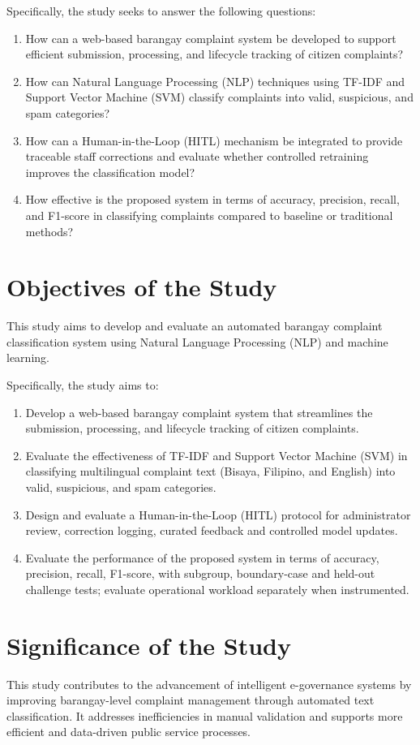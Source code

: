 Specifically, the study seeks to answer the following questions:
\begin{enumerate}
    \item How can a web-based barangay complaint system be developed to support efficient submission, processing, and lifecycle tracking of citizen complaints?
    \item How can Natural Language Processing (NLP) techniques using TF-IDF and Support Vector Machine (SVM) classify complaints into valid, suspicious, and spam categories?
    \item How can a Human-in-the-Loop (HITL) mechanism be integrated to provide traceable staff corrections and evaluate whether controlled retraining improves the classification model?
    \item How effective is the proposed system in terms of accuracy, precision, recall, and F1-score in classifying complaints compared to baseline or traditional methods?
\end{enumerate}

\section{Objectives of the Study}
This study aims to develop and evaluate an automated barangay complaint classification system using Natural Language Processing (NLP) and machine learning.

Specifically, the study aims to:
\begin{enumerate}
    \item Develop a web-based barangay complaint system that streamlines the submission, processing, and lifecycle tracking of citizen complaints.
    \item Evaluate the effectiveness of TF-IDF and Support Vector Machine (SVM) in classifying multilingual complaint text (Bisaya, Filipino, and English) into valid, suspicious, and spam categories.
    \item Design and evaluate a Human-in-the-Loop (HITL) protocol for administrator review, correction logging, curated feedback and controlled model updates.
    \item Evaluate the performance of the proposed system in terms of accuracy, precision, recall, F1-score, with subgroup, boundary-case and held-out challenge tests; evaluate operational workload separately when instrumented.
\end{enumerate}

\section{Significance of the Study}
This study contributes to the advancement of intelligent e-governance systems by improving barangay-level complaint management through automated text classification. It addresses inefficiencies in manual validation and supports more efficient and data-driven public service processes.

